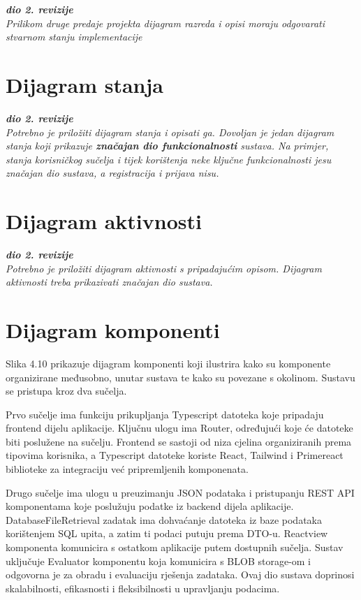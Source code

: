 			\textbf{\textit{dio 2. revizije}}\\			
			
			\textit{Prilikom druge predaje projekta dijagram razreda i opisi moraju odgovarati stvarnom stanju implementacije}
			
			
			
			\eject
		
		\section{Dijagram stanja}
			
			
			\textbf{\textit{dio 2. revizije}}\\
			
			\textit{Potrebno je priložiti dijagram stanja i opisati ga. Dovoljan je jedan dijagram stanja koji prikazuje \textbf{značajan dio funkcionalnosti} sustava. Na primjer, stanja korisničkog sučelja i tijek korištenja neke ključne funkcionalnosti jesu značajan dio sustava, a registracija i prijava nisu. }
			
			
			\eject 
		
		\section{Dijagram aktivnosti}
			
			\textbf{\textit{dio 2. revizije}}\\
			
			 \textit{Potrebno je priložiti dijagram aktivnosti s pripadajućim opisom. Dijagram aktivnosti treba prikazivati značajan dio sustava.}
			
			\eject
		\section{Dijagram komponenti}
		
		
			Slika 4.10 prikazuje dijagram komponenti koji ilustrira kako su komponente organizirane međusobno, unutar sustava te kako su povezane s okolinom. Sustavu se pristupa kroz dva sučelja. 
			
			Prvo sučelje ima funkciju prikupljanja Typescript datoteka koje pripadaju frontend dijelu aplikacije. Ključnu ulogu ima Router, određujući koje će datoteke biti poslužene na sučelju. Frontend se sastoji od niza cjelina organiziranih prema tipovima korisnika, a Typescript datoteke koriste React, Tailwind i Primereact biblioteke za integraciju već pripremljenih komponenata.
			
			Drugo sučelje ima ulogu u preuzimanju JSON podataka i pristupanju REST API komponentama koje poslužuju podatke iz backend dijela aplikacije. DatabaseFileRetrieval zadatak ima dohvaćanje datoteka iz baze podataka korištenjem SQL upita, a zatim ti podaci putuju prema DTO-u. Reactview komponenta komunicira s ostatkom aplikacije putem dostupnih sučelja. Sustav uključuje Evaluator komponentu koja komunicira s BLOB storage-om i odgovorna je za obradu i evaluaciju rješenja zadataka. Ovaj dio sustava doprinosi skalabilnosti, efikasnosti i fleksibilnosti u upravljanju podacima.
			 
